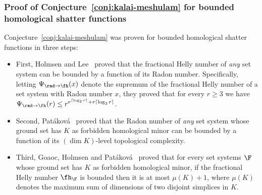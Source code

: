 \subsubsection{Proof of Conjecture~\ref{conj:kalai-meshulam} for bounded homological shatter functions}
%
Conjecture~\ref{conj:kalai-meshulam} was proven for bounded homological shatter functions in three steps: 
%
\begin{itemize}
\item First, Holmsen and Lee~\cite[Theorem~1.1]{Holmsen2021} proved that the fractional Helly number of \emph{any} set system can be bounded by a function of its Radon number. Specifically, letting $\Psi_{\rad \to \fh}(x)$ denote the supremum of the fractional Helly number of a set system with Radon number $x$, they proved  that for every $r \ge 3$ we have $\Psi_{\rad \to \fh}(r) \le r^{r^{\lceil \log_2r \rceil}+r\lceil \log_2r \rceil}$.\medskip
%
\item Second, Patáková~\cite[Theorem~2.1]{patakova2022bounding} proved that the Radon number of \emph{any} set system whose ground set has $K$ as forbidden homological minor can be bounded by a function of its $(\dim K)$-level topological complexity.\medskip
%
\item Third, Goaoc, Holmsen and Patáková~\cite[Theorem~1.2]{steppingUp} proved that for every set systems $\F$ whose ground set has $K$ as forbidden homological minor, if the fractional Helly number $\fh_\F$ is bounded then it is at most $\mu(K)+1$, where $\mu(K)$ denotes the maximum sum of dimensions of two disjoint simplices in $K$.
\end{itemize}
%
%
%

